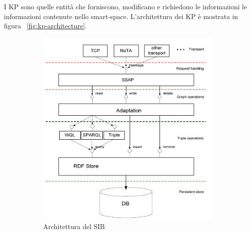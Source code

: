 I KP sono quelle entità che forniscono, modificano e richiedono le informazioni le informazioni contenute nello smart-space. L'architettura dei KP è mostrata in figura ~\ref{fig:kp-architecture}.

\begin{figure}[H]
        \centering
        \begin{subfigure}[H]{0.5\textwidth}
                \includegraphics[width=\textwidth]{assets/sib-architecture.jpg}
                \caption{Architettura del SIB}
                \label{fig:sib-architecture}
        \end{subfigure}%
        \begin{subfigure}[H]{0.42\textwidth}

\end{subfigure}
\end{figure}
